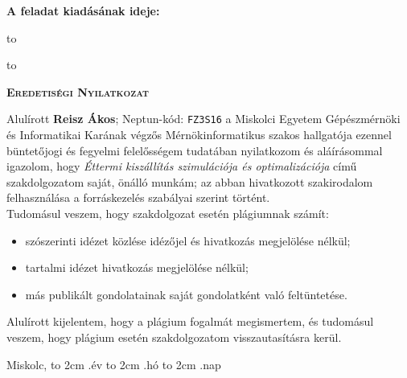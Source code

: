 
\noindent\textbf{A feladat kiadásának ideje:}\newline


\vskip 2cm

\hbox to 

\hbox to 

\newpage

\vspace*{1cm}  
\begin{center}
\large\textsc{\bfseries Eredetiségi Nyilatkozat}
\end{center}
\vspace*{2cm}  

Alulírott \textbf{Reisz Ákos}; Neptun-kód: \texttt{FZ3S16} a Miskolci Egyetem Gépészmérnöki és Informatikai Karának végzős Mérnökinformatikus szakos hallgatója ezennel büntetőjogi és fegyelmi felelősségem tudatában nyilatkozom és aláírásommal igazolom, hogy \textit{Éttermi kiszállítás szimulációja és optimalizációja}
című szakdolgozatom saját, önálló munkám; az abban hivatkozott szakirodalom
felhasználása a forráskezelés szabályai szerint történt.\\

Tudomásul veszem, hogy szakdolgozat esetén plágiumnak számít:
\begin{itemize}
\item szószerinti idézet közlése idézőjel és hivatkozás megjelölése nélkül;
\item tartalmi idézet hivatkozás megjelölése nélkül;
\item más publikált gondolatainak saját gondolatként való feltüntetése.
\end{itemize}

Alulírott kijelentem, hogy a plágium fogalmát megismertem, és tudomásul veszem, hogy
plágium esetén szakdolgozatom visszautasításra kerül.

\vspace*{3cm}

\noindent Miskolc, \hbox to 2cm{\dotfill} .év \hbox to 2cm{\dotfill} .hó \hbox to 2cm{\dotfill} .nap

\vspace*{3cm}

